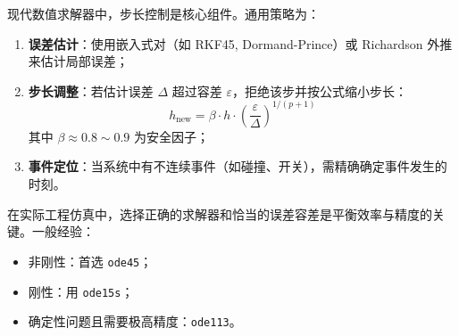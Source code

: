 现代数值求解器中，步长控制是核心组件。通用策略为：

\begin{enumerate}
	\item \textbf{误差估计}：使用嵌入式对（如 RKF45, Dormand-Prince）或 Richardson 外推来估计局部误差；
	\item \textbf{步长调整}：若估计误差 $\Delta$ 超过容差 $\varepsilon$，拒绝该步并按公式缩小步长：
	\[
	h_{\text{new}} = \beta \cdot h \cdot \left( \frac{\varepsilon}{\Delta} \right)^{1/(p+1)}
	\]
	其中 $\beta \approx 0.8\sim0.9$ 为安全因子；
	\item \textbf{事件定位}：当系统中有不连续事件（如碰撞、开关），需精确确定事件发生的时刻。
\end{enumerate}

\begin{remark}
	在实际工程仿真中，选择正确的求解器和恰当的误差容差是平衡效率与精度的关键。一般经验：
	\begin{itemize}
		\item 非刚性：首选 \texttt{ode45}；
		\item 刚性：用 \texttt{ode15s}；
		\item 确定性问题且需要极高精度：\texttt{ode113}。
	\end{itemize}
\end{remark}
